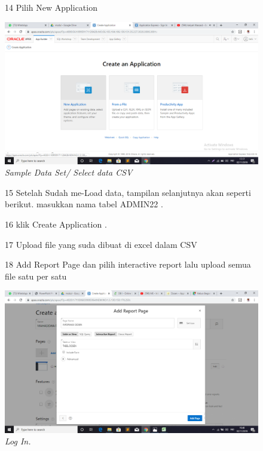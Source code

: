 \begin{enumerate}
\begin{figure}
\item[14] Pilih New Application

    \begin{center}
\includegraphics[scale=0.4]{apex/a3.png}
    \caption{\textit{Sample Data Set/ Select data CSV}}
        \end{center}
\label{gambar}
\end{figure}

\begin{figure}
\item[15] Setelah Sudah me-Load data, tampilan selanjutnya akan seperti berikut. masukkan nama tabel {ADMIN22} .

\end{figure}

\begin{figure}
\item[16] klik Create Application .

\end{figure}


\begin{figure}
\item[17] Upload file yang suda dibuat di excel dalam CSV
\end{figure}

\begin{figure}
\item[18] Add Report Page dan pilih interactive report lalu upload semua file satu per satu

      \begin{center}
\includegraphics[scale=0.4]{apex/a9.png}
    \caption{\textit{Log In.}}
        \end{center}
\label{gambar}
\end{figure}


\end{enumerate}

